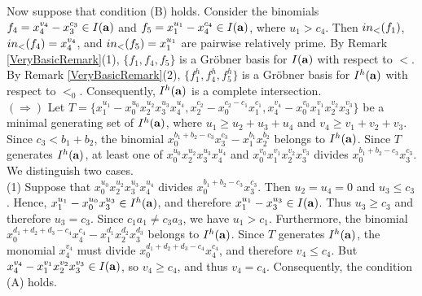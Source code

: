 \documentclass[10pt,a4paper]{amsart}
\begin{document}
Now suppose that condition (B) holds. Consider the binomials $f_{4}=x_{4}^{v_4}-x_{3}^{c_3} \in I({\bf a})$ and $f_{5}=x_{1}^{u_1}-x_{4}^{c_4} \in I({\bf a})$, where $u_1>c_4$. Then ${\rm in}_{<}(f_{1})$, ${\rm in}_{<}(f_{4})=x_{4}^{v_4}$, and ${\rm in}_{<}(f_{5})=x_{1}^{u_1}$ are pairwise relatively prime. By Remark \ref{VeryBasicRemark}(1), $\{f_1, f_4, f_5\}$ is a Gr\"obner basis for $I({\bf a})$ with respect to $<$. By Remark \ref{VeryBasicRemark}(2), $\{f_1^h, f_4^h, f_5^h\}$ is a Gr\"obner basis for $I^{h}({\bf a})$ with respect to $<_{0}$. Consequently, $I^{h}({\bf a})$ is a complete intersection.\\
$(\Rightarrow)$ Let $T=\{x_{1}^{u_1}-x_{0}^{u_0}x_{2}^{u_2}x_{3}^{u_3}x_{4}^{u_4}, x_{2}^{c_2}-x_{0}^{c_2-c_1}x_{1}^{c_1}, x_{4}^{v_4}-x_{0}^{v_0}x_{1}^{v_1}x_{2}^{v_2}x_{3}^{v_3}\}$ be a minimal generating set of $I^{h}({\bf a})$, where $u_{1} \geq u_2+u_3+u_4$ and $v_{4} \geq v_1+v_2+v_3$. Since $c_{3}<b_{1}+b_{2}$, the binomial $x_{0}^{b_{1}+b_{2}-c_{3}}x_{3}^{c_3}-x_{1}^{b_1}x_{2}^{b_2}$ belongs to $I^{h}({\bf a})$. Since $T$ generates $I^{h}({\bf a})$, at least one of $x_{0}^{u_0}x_{2}^{u_2}x_{3}^{u_3}x_{4}^{u_4}$ and $x_{0}^{v_0}x_{1}^{v_1}x_{2}^{v_2}x_{3}^{v_3}$ divides $x_{0}^{b_{1}+b_{2}-c_{3}}x_{3}^{c_3}$. We distinguish two cases.\\
(1) Suppose that $x_{0}^{u_0}x_{2}^{u_2}x_{3}^{u_3}x_{4}^{u_4}$ divides $x_{0}^{b_{1}+b_{2}-c_{3}}x_{3}^{c_3}$. Then $u_{2}=u_{4}=0$ and $u_{3} \leq c_{3}$. Hence, $x_{1}^{u_1}-x_{0}^{u_0}x_{3}^{u_3} \in I^{h}({\bf a})$, and therefore $x_{1}^{u_1}-x_{3}^{u_3} \in I({\bf a})$. Thus $u_{3} \geq c_{3}$ and therefore $u_{3}=c_{3}$. Since $c_1a_1 \neq c_3a_3$, we have $u_1>c_1$. Furthermore, the binomial $x_{0}^{d_1+d_2+d_3-c_4}x_{4}^{c_4}-x_{1}^{d_1}x_2^{d_2}x_3^{d_3}$ belongs to $I^{h}({\bf a})$. Since $T$ generates $I^{h}({\bf a})$, the monomial $x_4^{v_4}$ must divide $x_{0}^{d_1+d_2+d_3-c_4}x_{4}^{c_4}$, and therefore $v_4 \leq c_4$. But $x_{4}^{v_4}-x_{1}^{v_1}x_{2}^{v_2}x_{3}^{v_3} \in I({\bf a})$, so $v_{4} \geq c_4$, and thus $v_4=c_4$. Consequently, the condition (A) holds.\\
\end{document}
